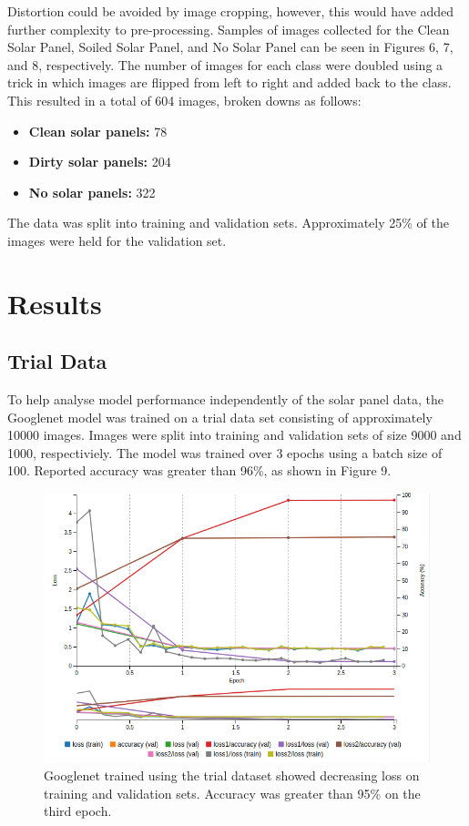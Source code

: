 \documentclass[10pt,journal,compsoc]{IEEEtran}
\begin{document}
		Distortion could be avoided by image cropping, however, this would have added further complexity to pre-processing. Samples of images collected for the Clean Solar Panel, Soiled Solar Panel, and No Solar Panel can be seen in Figures 6, 7, and 8, respectively. The number of images for each class were doubled using a trick in which images are flipped from left to right and added back to the class. This resulted in a total of 604 images, broken downs as follows:
		
		\begin{itemize}
			\item \textbf{Clean solar panels:} 78
			\item \textbf{Dirty solar panels:} 204
			\item \textbf{No solar panels:} 322
		\end{itemize}
		
		The data was split into training and validation sets. Approximately 25\% of the images were held for the validation set.
		
		\section{Results}
		\subsection{Trial Data}
		To help analyse model performance independently of the solar panel data, the Googlenet model was trained on a trial data set consisting of approximately 10000 images. Images were split into training and validation sets of size 9000 and 1000, respectiviely. The model was trained over 3 epochs using a batch size of 100. Reported accuracy was greater than 96\%, as shown in Figure 9. 
		\begin{figure}[h]
			\centering
			\includegraphics[scale=0.3]{trial_data_model_train}
			\caption{Googlenet trained using the trial dataset showed decreasing loss on training and validation sets. Accuracy was greater than 95\% on the third epoch.}
		\end{figure}
		
\end{document}
